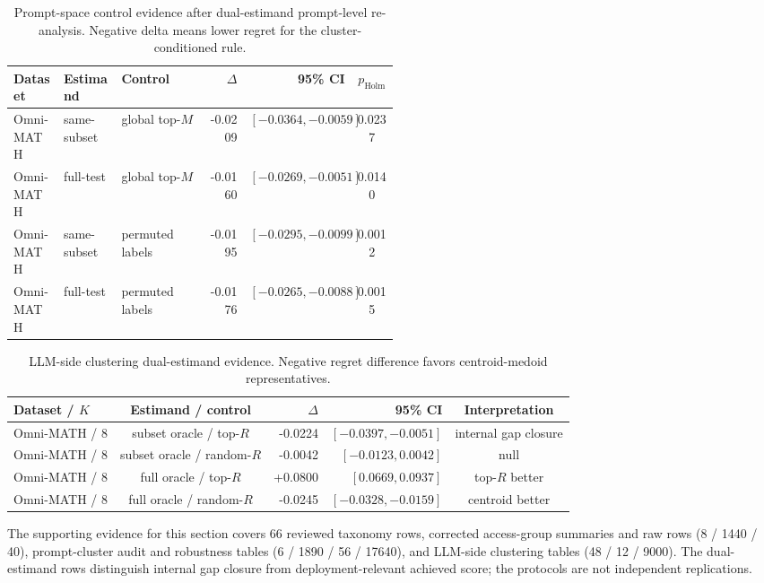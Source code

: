 \documentclass{article}
\begin{document}
\begin{table}[htbp]
  \caption{Prompt-space control evidence after dual-estimand prompt-level re-analysis. Negative delta means lower regret for the cluster-conditioned rule.}
  \label{tab:app-prompt-cluster}
  \centering
  \scriptsize
  \setlength{\tabcolsep}{3pt}
  \begin{tabular}{>{\raggedright\arraybackslash}p{0.13\linewidth} >{\raggedright\arraybackslash}p{0.15\linewidth} >{\raggedright\arraybackslash}p{0.22\linewidth} rrc}
    \toprule
    Dataset & Estimand & Control & $\Delta$ & 95\% CI & $p_{\text{Holm}}$ \\
    \midrule
    Omni-MATH & same-subset & global top-$M$ & -0.0209 & $[-0.0364,-0.0059]$ & 0.0237 \\
    Omni-MATH & full-test & global top-$M$ & -0.0160 & $[-0.0269,-0.0051]$ & 0.0140 \\
    Omni-MATH & same-subset & permuted labels & -0.0195 & $[-0.0295,-0.0099]$ & 0.0012 \\
    Omni-MATH & full-test & permuted labels & -0.0176 & $[-0.0265,-0.0088]$ & 0.0015 \\
    \bottomrule
  \end{tabular}
\end{table}

\begin{table}[htbp]
  \caption{LLM-side clustering dual-estimand evidence. Negative regret difference favors centroid-medoid representatives.}
  \label{tab:app-llm-cluster}
  \centering
  \scriptsize
  \begin{tabular}{lcrrc}
    \toprule
    Dataset / $K$ & Estimand / control & $\Delta$ & 95\% CI & Interpretation \\
    \midrule
    Omni-MATH / 8 & subset oracle / top-$R$ & -0.0224 & $[-0.0397,-0.0051]$ & internal gap closure \\
    Omni-MATH / 8 & subset oracle / random-$R$ & -0.0042 & $[-0.0123,0.0042]$ & null \\
    Omni-MATH / 8 & full oracle / top-$R$ & +0.0800 & $[0.0669,0.0937]$ & top-$R$ better \\
    Omni-MATH / 8 & full oracle / random-$R$ & -0.0245 & $[-0.0328,-0.0159]$ & centroid better \\
    \bottomrule
  \end{tabular}
\end{table}

The supporting evidence for this section covers 66 reviewed taxonomy rows, corrected access-group summaries and raw rows (8 / 1440 / 40), prompt-cluster audit and robustness tables (6 / 1890 / 56 / 17640), and LLM-side clustering tables (48 / 12 / 9000). The dual-estimand rows distinguish internal gap closure from deployment-relevant achieved score; the protocols are not independent replications.
\end{document}
